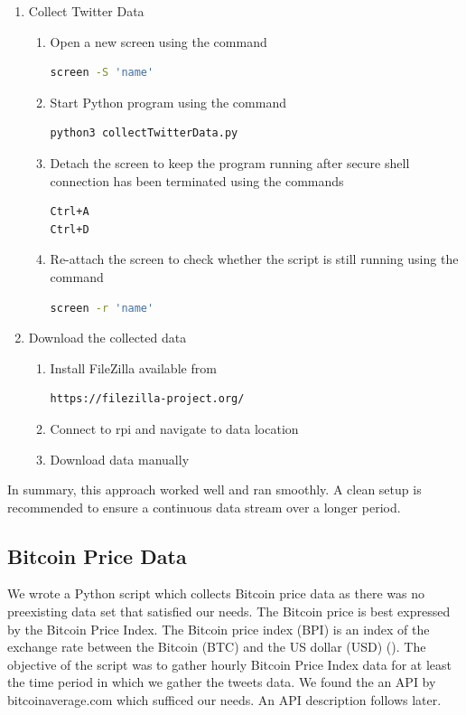 \documentclass[a4paper,12pt]{article}
\begin{document}
\begin{spacing}{1.2}
\begin{enumerate}
\item Collect Twitter Data
\begin{enumerate}
\item Open a new screen using the command
\begin{lstlisting}[language=bash] 
screen -S 'name' 
\end{lstlisting}
\item Start Python program using the command
\begin{lstlisting}[language=bash]
python3 collectTwitterData.py
\end{lstlisting}
\item Detach the screen to keep the program running after secure shell connection has been terminated using the commands
\begin{lstlisting}[language=bash]
Ctrl+A
Ctrl+D
\end{lstlisting}
\item Re-attach the screen to check whether the script is still running using the command
\begin{lstlisting}[language=bash]
screen -r 'name'
\end{lstlisting}
\end{enumerate}

\item Download the collected data
\begin{enumerate}
\item Install FileZilla available from
\begin{lstlisting}[language=bash] 
https://filezilla-project.org/
\end{lstlisting}
\item Connect to rpi and navigate to data location \newline
\item Download data manually \newline \newline \end{enumerate}
\end{enumerate}
In summary, this approach worked well and ran smoothly. A clean setup is recommended to ensure a continuous data stream over a longer period.


\subsection{Bitcoin Price Data}
We wrote a Python script which collects Bitcoin price data as there was no preexisting data set that satisfied our needs. The Bitcoin price is best expressed by the Bitcoin Price Index. The Bitcoin price index (BPI) is an index of the exchange rate between the Bitcoin (BTC) and the US dollar (USD) (\cite{kristoufek2015main}). The objective of the script was to gather hourly Bitcoin Price Index data for at least the time period in which we gather the tweets data. We found the an API by bitcoinaverage.com which sufficed our needs. An API description follows later.


\end{spacing}
\end{document}
